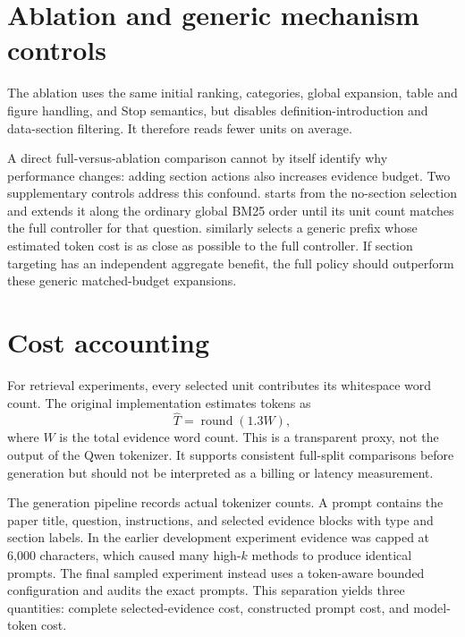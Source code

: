 \section{Ablation and generic mechanism controls}

The  ablation uses the same initial ranking, categories, global expansion, table and figure handling, and Stop semantics, but disables definition-introduction and data-section filtering. It therefore reads fewer units on average.

A direct full-versus-ablation comparison cannot by itself identify why performance changes: adding section actions also increases evidence budget. Two supplementary controls address this confound.  starts from the no-section selection and extends it along the ordinary global BM25 order until its unit count matches the full controller for that question.  similarly selects a generic prefix whose estimated token cost is as close as possible to the full controller. If section targeting has an independent aggregate benefit, the full policy should outperform these generic matched-budget expansions.

\section{Cost accounting}

For retrieval experiments, every selected unit contributes its whitespace word count. The original implementation estimates tokens as
\begin{equation}
    \widehat{T}=\operatorname{round}(1.3W),
\end{equation}
where $W$ is the total evidence word count. This is a transparent proxy, not the output of the Qwen tokenizer. It supports consistent full-split comparisons before generation but should not be interpreted as a billing or latency measurement.

The generation pipeline records actual tokenizer counts. A prompt contains the paper title, question, instructions, and selected evidence blocks with type and section labels. In the earlier development experiment evidence was capped at 6,000 characters, which caused many high-$k$ methods to produce identical prompts. The final sampled experiment instead uses a token-aware bounded configuration and audits the exact prompts. This separation yields three quantities: complete selected-evidence cost, constructed prompt cost, and model-token cost.


